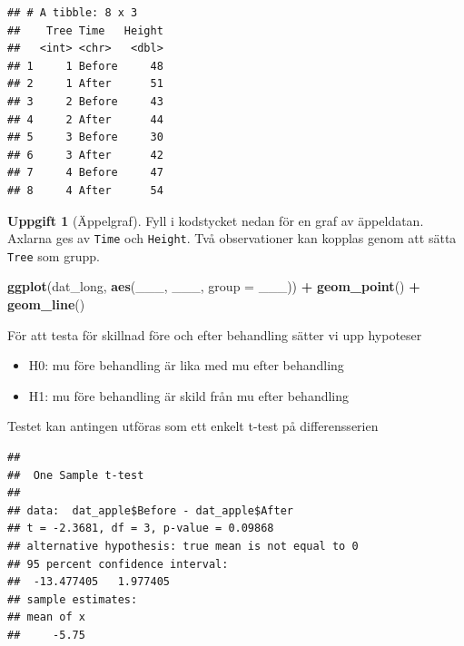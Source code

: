 \documentclass[
]{book}
\newenvironment{Shaded}{\begin{snugshade}}{\end{snugshade}}
\newcommand{\AttributeTok}[1]{\textcolor[rgb]{0.13,0.29,0.53}{#1}}
\newcommand{\FunctionTok}[1]{\textcolor[rgb]{0.13,0.29,0.53}{\textbf{#1}}}
\newcommand{\NormalTok}[1]{#1}
\newcommand{\SpecialCharTok}[1]{\textcolor[rgb]{0.81,0.36,0.00}{\textbf{#1}}}
\providecommand{\tightlist}{%
  \setlength{\itemsep}{0pt}\setlength{\parskip}{0pt}}
\theoremstyle{definition}
\theoremstyle{definition}
\theoremstyle{definition}
\newtheorem{exercise}{Uppgift}[chapter]
\theoremstyle{definition}
\theoremstyle{remark}
\begin{document}
\begin{verbatim}
## # A tibble: 8 x 3
##    Tree Time   Height
##   <int> <chr>   <dbl>
## 1     1 Before     48
## 2     1 After      51
## 3     2 Before     43
## 4     2 After      44
## 5     3 Before     30
## 6     3 After      42
## 7     4 Before     47
## 8     4 After      54
\end{verbatim}

\begin{exercise}[Äppelgraf]

Fyll i kodstycket nedan för en graf av äppeldatan. Axlarna ges av \texttt{Time} och \texttt{Height}. Två observationer kan kopplas genom att sätta \texttt{Tree} som grupp.

\begin{Shaded}
\begin{Highlighting}[]
\FunctionTok{ggplot}\NormalTok{(dat\_long, }\FunctionTok{aes}\NormalTok{(\_\_\_, \_\_\_, }\AttributeTok{group =}\NormalTok{ \_\_\_)) }\SpecialCharTok{+}
  \FunctionTok{geom\_point}\NormalTok{() }\SpecialCharTok{+}
  \FunctionTok{geom\_line}\NormalTok{()}
\end{Highlighting}
\end{Shaded}

\end{exercise}

För att testa för skillnad före och efter behandling sätter vi upp hypoteser

\begin{itemize}
\tightlist
\item
  H0: mu före behandling är lika med mu efter behandling
\item
  H1: mu före behandling är skild från mu efter behandling
\end{itemize}

Testet kan antingen utföras som ett enkelt t-test på differensserien

\begin{Shaded}
\end{Shaded}

\begin{verbatim}
## 
##  One Sample t-test
## 
## data:  dat_apple$Before - dat_apple$After
## t = -2.3681, df = 3, p-value = 0.09868
## alternative hypothesis: true mean is not equal to 0
## 95 percent confidence interval:
##  -13.477405   1.977405
## sample estimates:
## mean of x 
##     -5.75
\end{verbatim}
\end{document}
